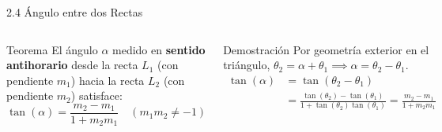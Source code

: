 \documentclass[10pt,aspectratio=169,spanish]{beamer}
\begin{document}
\begin{frame}{2.4 Ángulo entre dos Rectas}
\begin{columns}
  \begin{block}{Teorema}
  El ángulo $\alpha$ medido en \textbf{sentido antihorario} desde la recta $L_1$ (con pendiente $m_1$) hacia la recta $L_2$ (con pendiente $m_2$) satisface:
  \[
    \tan(\alpha) = \frac{m_2 - m_1}{1 + m_2 m_1} \quad (m_1 m_2 \neq -1)
  \]
  \end{block}

  \begin{exampleblock}{Demostración}
  Por geometría exterior en el triángulo, $\theta_2 = \alpha + \theta_1 \implies \alpha = \theta_2 - \theta_1$.
  \[
    \begin{aligned}
      \tan(\alpha) &= \tan(\theta_2 - \theta_1) \\
      &= \frac{\tan(\theta_2) - \tan(\theta_1)}{1 + \tan(\theta_2)\tan(\theta_1)} = \frac{m_2 - m_1}{1 + m_2 m_1}
    \end{aligned}
  \]
  \end{exampleblock}

  \begin{center}
  \end{center}
\end{columns}
\end{frame}


\end{document}
